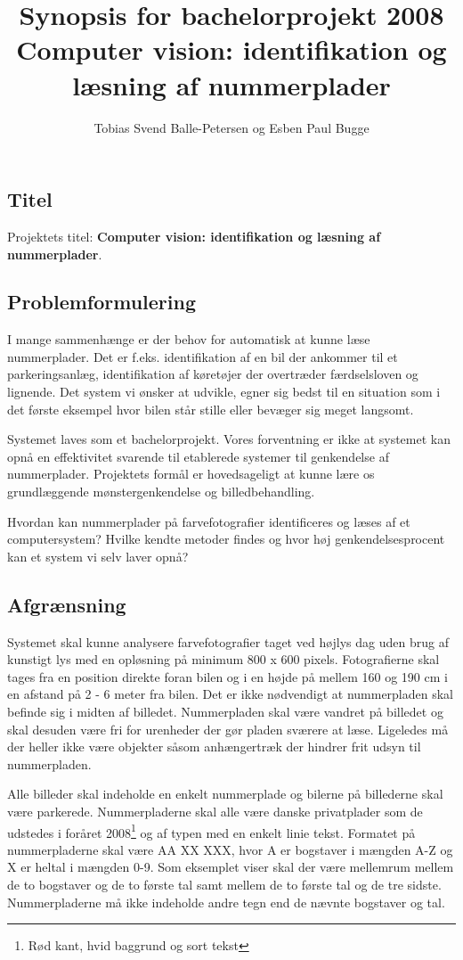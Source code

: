 \documentclass[10pt,a4paper,final]{report}
\author{Tobias Svend Balle-Petersen og Esben Paul Bugge}
\title{Synopsis for bachelorprojekt 2008\\\large{Computer vision: identifikation og læsning af nummerplader}}
\begin{document}
\maketitle

\subsection*{Titel}
Projektets titel: \textbf{Computer vision: identifikation og læsning af nummerplader}.
\subsection*{Problemformulering}
I mange sammenhænge er der behov for automatisk at kunne læse nummerplader. Det er f.eks. identifikation af en bil der ankommer til et parkeringsanlæg, identifikation af køretøjer der overtræder færdselsloven og lignende. Det system vi ønsker at udvikle, egner sig bedst til en situation som i det første eksempel hvor bilen står stille eller bevæger sig meget langsomt.

Systemet laves som et bachelorprojekt. Vores forventning er ikke at systemet kan opnå en effektivitet svarende til etablerede systemer til genkendelse af nummerplader. Projektets formål er hovedsageligt at kunne lære os grundlæggende mønstergenkendelse og billedbehandling.

Hvordan kan nummerplader på farvefotografier identificeres og læses af et computersystem? Hvilke kendte metoder findes og hvor høj genkendelsesprocent kan et system vi selv laver opnå?

\subsection*{Afgrænsning}
Systemet skal kunne analysere farvefotografier taget ved højlys dag uden brug af kunstigt lys med en opløsning på minimum 800 x 600 pixels. Fotografierne skal tages fra en position direkte foran bilen og i en højde på mellem 160 og 190 cm i en afstand på 2 - 6 meter fra bilen. Det er ikke nødvendigt at nummerpladen skal befinde sig i midten af billedet. Nummerpladen skal være vandret på billedet og skal desuden være fri for urenheder der gør pladen sværere at læse. Ligeledes må der heller ikke være objekter såsom anhængertræk der hindrer frit udsyn til nummerpladen.

Alle billeder skal indeholde en enkelt nummerplade og bilerne på billederne skal være parkerede. Nummerpladerne skal alle være danske privatplader som de udstedes i foråret 2008\footnote{Rød kant, hvid baggrund og sort tekst} og af typen med en enkelt linie tekst. Formatet på nummerpladerne skal være AA XX XXX, hvor A er bogstaver i mængden A-Z og X er heltal i mængden 0-9. Som eksemplet viser skal der være mellemrum mellem de to bogstaver og de to første tal samt mellem de to første tal og de tre sidste. Nummerpladerne må ikke indeholde andre tegn end de nævnte bogstaver og tal.
\end{document}
